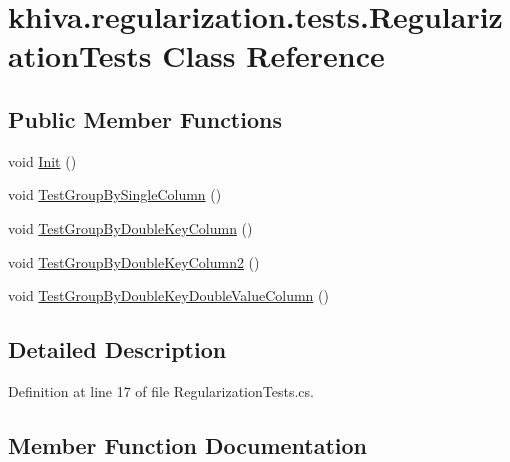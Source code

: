 \hypertarget{classkhiva_1_1regularization_1_1tests_1_1_regularization_tests}{}\section{khiva.\+regularization.\+tests.\+Regularization\+Tests Class Reference}
\label{classkhiva_1_1regularization_1_1tests_1_1_regularization_tests}
\subsection*{Public Member Functions}
\begin{DoxyCompactItemize}
\item 
void \mbox{\hyperlink{classkhiva_1_1regularization_1_1tests_1_1_regularization_tests_ac5b1e958f08a15cd70e035f62a9b590f}{Init}} ()
\item 
void \mbox{\hyperlink{classkhiva_1_1regularization_1_1tests_1_1_regularization_tests_a3afa87d13c51c794b895b812f1efbb74}{Test\+Group\+By\+Single\+Column}} ()
\item 
void \mbox{\hyperlink{classkhiva_1_1regularization_1_1tests_1_1_regularization_tests_a5c1f7fe81efa52a795ec5b01882214c0}{Test\+Group\+By\+Double\+Key\+Column}} ()
\item 
void \mbox{\hyperlink{classkhiva_1_1regularization_1_1tests_1_1_regularization_tests_a25d058103cb1acb90a2d087ac9ee845d}{Test\+Group\+By\+Double\+Key\+Column2}} ()
\item 
void \mbox{\hyperlink{classkhiva_1_1regularization_1_1tests_1_1_regularization_tests_aa9c7ae5b745ef6a14c883cd3753c405d}{Test\+Group\+By\+Double\+Key\+Double\+Value\+Column}} ()
\end{DoxyCompactItemize}


\subsection{Detailed Description}


Definition at line 17 of file Regularization\+Tests.\+cs.



\subsection{Member Function Documentation}
\mbox{\label{classkhiva_1_1regularization_1_1tests_1_1_regularization_tests_ac5b1e958f08a15cd70e035f62a9b590f}} 
